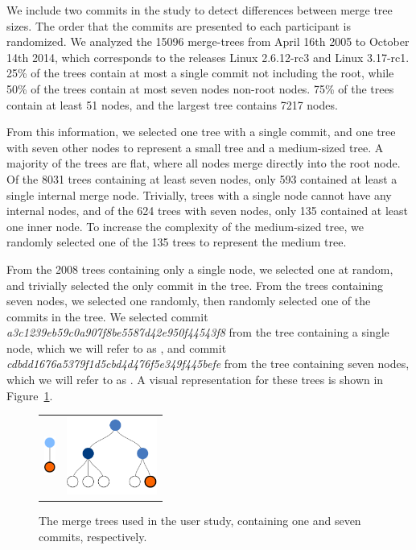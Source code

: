 We include two commits in the study to detect differences between merge
tree sizes. The order that the commits are presented to each participant
is randomized. We analyzed the 15096 merge-trees from April 16th 2005 to
October 14th 2014, which corresponds to the releases Linux 2.6.12-rc3
and Linux 3.17-rc1. 25\% of the trees contain at most a single commit
not including the root, while 50\% of the trees contain at most seven
nodes non-root nodes.
75\% of the trees contain at least 51 nodes, and the largest tree
contains 7217 nodes.

From this information, we selected one tree with a single commit, and
one tree with seven other nodes to represent a small tree and a
medium-sized tree. A majority of the trees are flat, where all nodes
merge directly into the root node. Of the 8031 trees containing at least
seven nodes, only 593 contained at least a single internal merge node.
Trivially, trees with a single node cannot have any internal nodes, and
of the 624 trees with seven nodes, only 135 contained at least one inner
node. To increase the complexity of the medium-sized tree, we randomly
selected one of the 135 trees to represent the medium tree.

From the 2008 trees containing only a single node, we selected one at
random, and trivially selected the only commit in the tree. From the
trees containing seven nodes, we selected one randomly, then randomly
selected one of the commits in the tree. We selected commit
\emph{a3c1239eb59c0a907f8be5587d42e950f44543f8} from the tree containing
a single node, which we will refer to as \comA, and commit
\emph{cdbdd1676a5379f1d5cbd4d476f5e349f445befe} from the tree containing
seven nodes, which we will refer to as \comB. A visual representation
for these trees is shown in Figure~\ref{fig:study_commits}.

\begin{figure}[bpt]
  \centering
  \begin{tabular}{ m{1.5cm} m{3cm} }
    \includegraphics[height=0.5in]{figures/commits/1-commit.pdf} &
    \includegraphics[height=1in]{figures/commits/7-commits.pdf}\\
  \end{tabular}
  \caption{The merge trees used in the user study,
    containing one and seven commits, respectively.}
  \label{fig:study_commits}
\end{figure}

